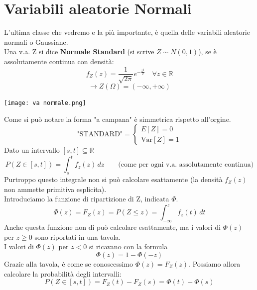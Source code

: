 \documentclass[12pt, a4paper, openany]{book}
\begin{document}
\section{Variabili aleatorie Normali}
L'ultima classe che vedremo e la più importante, è quella delle variabili aleatorie
normali o Gaussiane.
\\ Una v.a. Z si dice \textbf{Normale Standard} (si scrive $Z \sim N(0,1)$), se è
assolutamente continua con densità:
\begin{equation*}
    f_Z(z)= \frac{1}{\sqrt{2 \pi}} e^{-\frac{z^2}{2}} 
    \quad \forall z \in \mathbb{R}
\end{equation*}
\begin{equation*}
    \rightarrow Z(\Omega) = (-\infty, + \infty)
\end{equation*}
\begin{center}
    \texttt{[image: va normale.png]}
\end{center}
Come si può notare la forma "a campana" è simmetrica rispetto all'orgine.
\begin{equation}
    \text{"STANDARD"} =
    \begin{cases}
        E[Z] = 0 \\
        \text{Var}[Z] = 1
    \end{cases}
\end{equation}
Dato un intervallo $[s,t] \subseteq \mathbb{R}$
\begin{equation*}
    P(Z\in [s,t]) = \int_{s}^{t} f_z(z)\,dz \qquad 
    \text{(come per ogni v.a. assolutamente continua)}
\end{equation*}
Purtroppo questo integrale non si può calcolare esattamente (la densità $f_Z(z)$
non ammette primitiva esplicita).
\\ Introduciamo la funzione di ripartizione di Z, indicata $\Phi$.
\begin{equation*}
    \Phi(z) = F_Z(z) = P(Z \leq z) = \int_{-\infty}^{z}f_z(t)\,dt
\end{equation*}
Anche questa funzione non di può calcolare esattamente, ma i valori di $\Phi(z)$ per
$z \geq 0$ sono riportati in una tavola.
\\ I valori di $\Phi(z)$ per $z < 0$ si ricavano con la formula
\begin{equation*}
    \Phi(z) = 1 - \Phi(-z)
\end{equation*}
Grazie alla tavola, è come se conoscessimo $\Phi(z) = F_Z(z)$.
Possiamo allora calcolare la probabilità degli intervalli:
\begin{equation*}
    P(Z\in [s,t]) = F_Z(t) - F_Z(s) = \Phi(t) - \Phi(s)
\end{equation*}
\end{document}
